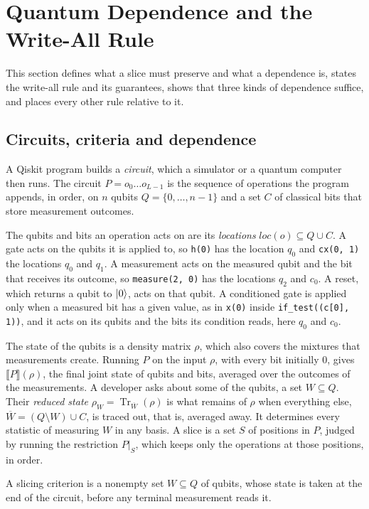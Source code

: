 \section{Quantum Dependence and the Write-All Rule}\label{sec:core}

This section defines what a slice must preserve and what a dependence is, states the write-all rule and its
guarantees, shows that three kinds of dependence suffice, and places every other rule relative to it.

\subsection{Circuits, criteria and dependence}
A Qiskit program builds a \emph{circuit}, which a simulator or a quantum computer then runs. The circuit
$P = o_0 \dots o_{L-1}$ is the sequence of operations the program appends, in order, on $n$ qubits
$Q = \{0, \dots, n-1\}$ and a set $C$ of classical bits that store measurement outcomes.

The qubits and bits an operation acts on are its \emph{locations} $\mathit{loc}(o) \subseteq Q \cup C$. A gate
acts on the qubits it is applied to, so \texttt{h(0)} has the location $q_0$ and \texttt{cx(0, 1)} the
locations $q_0$ and $q_1$. A measurement acts on the measured qubit and the bit that receives its outcome, so
\texttt{measure(2, 0)} has the locations $q_2$ and $c_0$. A reset, which returns a qubit to $\lvert 0\rangle$, acts on that
qubit. A conditioned gate is applied only when a measured bit has a given value, as in \texttt{x(0)} inside
\texttt{if\_test((c[0], 1))}, and it acts on its qubits and the bits its condition reads, here $q_0$ and $c_0$.

The state of the qubits is a density matrix $\rho$, which also covers the mixtures that measurements create. Running $P$ on the input $\rho$, with every bit initially $0$, gives
$\llbracket P \rrbracket(\rho)$, the final joint state of qubits and bits, averaged over the outcomes of the
measurements. A developer asks about some of the qubits, a set $W \subseteq Q$. Their \emph{reduced state}
$\rho_W = \operatorname{Tr}_{\overline{W}}(\rho)$ is what remains of $\rho$ when everything else,
$\overline{W} = (Q \setminus W) \cup C$, is traced out, that is, averaged away. It determines every statistic of
measuring $W$ in any basis. A slice is a set $S$ of positions in $P$, judged by running the restriction $P|_S$, which
keeps only the operations at those positions, in order.

\begin{definition}\label{def:criterion}
A slicing criterion is a nonempty set $W \subseteq Q$ of qubits, whose state is taken at the end of the circuit,
before any terminal measurement reads it.
\end{definition}

